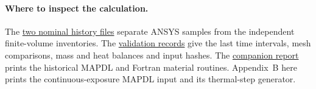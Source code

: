\paragraph{Where to inspect the calculation.}
The \href{https://github.com/MDNich/MIT-RT-26_27-Work/tree/main/simulation_work/solidprop/iris/v1/output/data}{two nominal history files}
separate ANSYS samples from the independent finite-volume inventories.
The \href{https://github.com/MDNich/MIT-RT-26_27-Work/tree/main/simulation_work/solidprop/iris/v1/validation}{validation records}
give the last time intervals, mesh comparisons, mass and heat balances and input
hashes. The \href{https://github.com/MDNich/MIT-RT-26_27-Work/blob/main/simulation_work/solidprop/iris/v1/output/pdf/iris_phenolic_report.pdf}{companion report}
prints the historical MAPDL and Fortran material routines. Appendix~B here
prints the continuous-exposure MAPDL input and its thermal-step generator.
\clearpage
